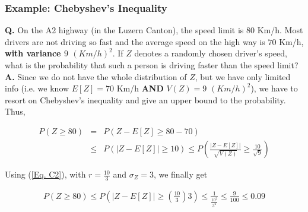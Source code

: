 \documentclass[notes=show,smaller,handout]{beamer}
\begin{document}
\begin{frame}%



\frametitle{Example: Chebyshev's Inequality}

\begin{example}

\textbf{Q.} On the A2 highway (in the Luzern Canton), the speed limit is $80$ Km/h. Most drivers are not driving so fast and the average speed on the high way is $70$ Km/h, \textbf{with variance $9$ $(Km/h)^2$}.
If $Z$ denotes a randomly chosen driver's speed, what is the probability that such a person is driving faster than the speed limit? \\
\vspace{0.25cm}
\textbf{A.} Since we do not have the whole distribution of $Z$, but we have only limited info (i.e. we know $E[Z]=70$ Km/h \textbf{AND} $V(Z)=9$ $(Km/h)^2$), we have to resort on Chebyshev's inequality and give an upper bound to the probability. Thus,
\begin{small}
\begin{eqnarray*}
P( Z \geq 80) &=& P( Z - E[Z]\geq 80 - 70) \\ &\leq& P(\vert Z-E[Z] \vert \geq 10) \leq  P\left( \frac{\vert Z-E[Z] \vert }{\sqrt{V(Z)}}\geq \frac{10}{\sqrt{9}}\right) 
\end{eqnarray*}
\end{small}

Using (\ref{Eq. C2}), with $r=\frac{10}{3}$ and $\sigma_Z= 3$, we finally get
\begin{small}
\begin{eqnarray*}
P( Z \geq 80) \leq P\left(\Big\vert Z-E[Z] \Big\vert \geq \left(\frac{10}{3}\right) {3}\right) \leq \frac{1}{\frac{10^2}{3^2}} \leq \frac{9}{100} \leq 0.09 
\end{eqnarray*}
\end{small}

\end{example}

\end{frame}%
\end{document}

